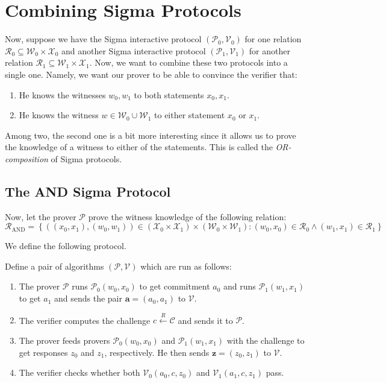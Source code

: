 \documentclass[../lecture-notes.tex]{subfiles}
\begin{document}
\section{Combining Sigma Protocols}

Now, suppose we have the Sigma interactive protocol $(\mathcal{P}_0,\mathcal{V}_0)$ for one relation $\mathcal{R}_0 \subseteq \mathcal{W}_0 \times \mathcal{X}_0$ and another Sigma interactive protocol $(\mathcal{P}_1,\mathcal{V}_1)$ for another relation $\mathcal{R}_1 \subseteq \mathcal{W}_1 \times \mathcal{X}_1$. Now, we want to combine these two protocols into a single one. Namely, we want our prover to be able to convince the verifier that:
\begin{enumerate}
    \item He knows the witnesses $w_0,w_1$ to both statements $x_0,x_1$.
    \item He knows the witness $w \in \mathcal{W}_0 \cup \mathcal{W}_1$ to either statement $x_0$ or $x_1$.
\end{enumerate}

Among two, the second one is a bit more interesting since it allows us to prove the knowledge of a witness to either of the statements. This is called the \textit{OR-composition} of Sigma protocols.

\subsection{The AND Sigma Protocol}

Now, let the prover $\mathcal{P}$ prove the witness knowledge of the following relation:
\begin{equation*}
    \mathcal{R}_{\text{AND}} = \left\{ ((x_0,x_1), (w_0,w_1)) \in (\mathcal{X}_0 \times \mathcal{X}_1) \times (\mathcal{W}_0 \times \mathcal{W}_1): (w_0,x_0) \in \mathcal{R}_0 \wedge (w_1,x_1) \in \mathcal{R}_1 \right\}
\end{equation*}

We define the following protocol.

\begin{definition}
    Define a pair of algorithms $(\mathcal{P},\mathcal{V})$ which are run as follows:
    \begin{enumerate}
        \item The prover $\mathcal{P}$ runs $\mathcal{P}_0(w_0,x_0)$ to get commitment $a_0$ and runs $\mathcal{P}_1(w_1,x_1)$ to get $a_1$ and sends the pair $\mathbf{a} = (a_0,a_1)$ to $\mathcal{V}$.
        \item The verifier computes the challenge $c \xleftarrow{R} \mathcal{C}$ and sends it to $\mathcal{P}$.
        \item The prover feeds provers $\mathcal{P}_0(w_0,x_0)$ and $\mathcal{P}_1(w_1,x_1)$ with the challenge to get responses $z_0$ and $z_1$, respectively. He then sends $\mathbf{z} = (z_0,z_1)$ to $\mathcal{V}$.
        \item The verifier checks whether both $\mathcal{V}_0(a_0,c,z_0)$ and $\mathcal{V}_1(a_1,c,z_1)$ pass.
    \end{enumerate}
\end{definition}
\end{document}
